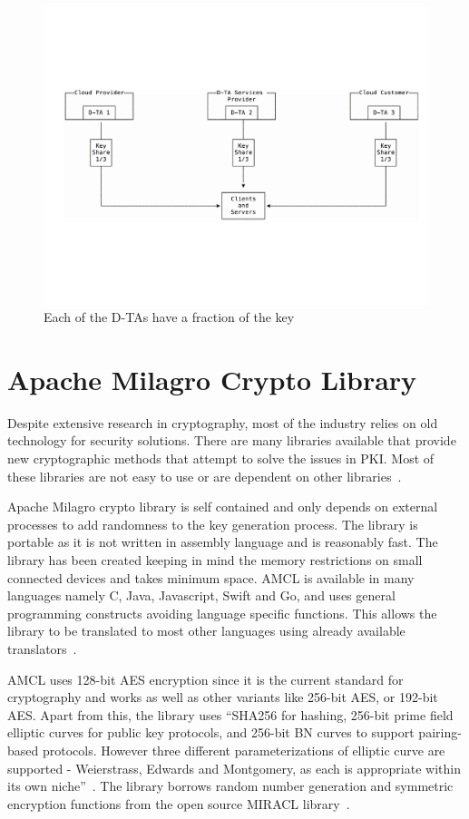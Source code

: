 \begin{figure}[!ht]
  \centering\includegraphics[width=\columnwidth]{../images/dta.pdf} \caption{Each
  of the D-TAs have a fraction of the
  key~\cite{hid-sp18-503-dta-image} }\label{f:fig1}
\end{figure}

\section{Apache Milagro Crypto Library}
Despite extensive research in cryptography, most of the industry
relies on old technology for security solutions. There are many
libraries available that provide new cryptographic methods that
attempt to solve the issues in PKI\@. Most of these libraries are not
easy to use or are dependent on other
libraries~\cite{hid-sp18-503-mcl-white-paper}.

Apache Milagro crypto library is self contained and only depends on
external processes to add randomness to the key generation
process. The library is portable as it is not written in assembly
language and is reasonably fast. The library has been created keeping
in mind the memory restrictions on small connected devices and takes
minimum space. AMCL is available in many languages namely C, Java,
Javascript, Swift and Go, and uses general programming constructs
avoiding language specific functions. This allows the library to be
translated to most other languages using already available
translators~\cite{hid-sp18-503-mcl-white-paper}.

AMCL uses 128-bit AES encryption since it is the current standard for
cryptography and works as well as other variants like 256-bit AES, or
192-bit AES\@. Apart from this, the library uses ``SHA256 for hashing,
256-bit prime field elliptic curves for public key protocols, and
256-bit BN curves to support pairing-based protocols. However three
different parameterizations of elliptic curve are supported -
Weierstrass, Edwards and Montgomery, as each is appropriate within its
own niche''~\cite{hid-sp18-503-mcl-white-paper}. The library borrows
random number generation and symmetric encryption functions from the
open source MIRACL library~\cite{hid-sp18-503-mcl-white-paper}.


